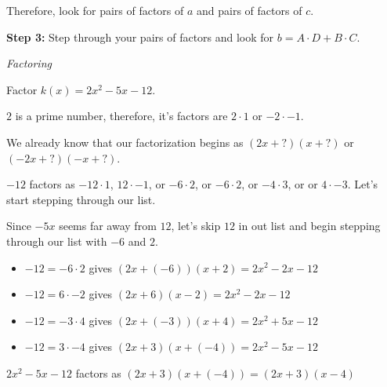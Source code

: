 \documentclass{ximera}
\begin{document}
Therefore, look for pairs of factors of $a$ and pairs of factors of $c$.






\textbf{Step 3:} Step through your pairs of factors and look for $b = A \cdot D + B \cdot C$.










\begin{example} \textit{Factoring}

Factor $k(x) = 2 x^2 - 5 x - 12$.


$2$ is a prime number, therefore, it's factors are $2 \cdot 1$ or $-2 \cdot -1$.

We already know that our factorization begins as $(2 x + ?) (x + ?)$ or $(-2 x + ?) (-x + ?)$.

$-12$ factors as $-12 \cdot 1$, $12 \cdot -1$, or $-6 \cdot 2$, or  $-6 \cdot 2$, or $-4 \cdot 3$, or or $4 \cdot -3$.  Let's start stepping through our list.

Since $-5 x$ seems far away from $12$, let's skip $12$ in out list and begin stepping through our list with $-6$ and $2$.

\begin{itemize}

\item $-12 = -6 \cdot 2$ gives $(2 x + (-6)) (x + 2) = 2 x^2 - 2 x - 12$
\item $-12 = 6 \cdot -2$ gives $(2 x + 6) (x - 2) = 2 x^2 - 2 x -12$
\item $-12 = -3 \cdot 4$ gives $(2 x + (-3)) (x + 4) = 2 x^2 + 5 x - 12$
\item $-12 = 3 \cdot -4$ gives $(2 x + 3) (x + (-4)) = 2 x^2 - 5 x -12$
\end{itemize}

$2 x^2 - 5 x - 12$ factors as $(2 x + 3) (x + (-4)) = (2 x + 3)(x - 4)$

\end{example}
\end{document}
